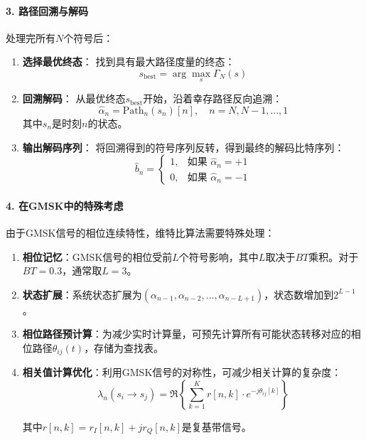 \documentclass[12pt,a4paper,twoside]{article}
\numberwithin{equation}{section}
\begin{document}
\paragraph{3. 路径回溯与解码}

处理完所有$N$个符号后：

\begin{enumerate}
    \item \textbf{选择最优终态}：
    找到具有最大路径度量的终态：
    \begin{equation}
        s_{\text{best}} = \arg\max_{s} \Gamma_N(s)
    \end{equation}
    
    \item \textbf{回溯解码}：
    从最优终态$s_{\text{best}}$开始，沿着幸存路径反向追溯：
    \begin{equation}
        \hat{\alpha}_n = \text{Path}_n(s_n)[n], \quad n = N, N-1, \dots, 1
    \end{equation}
    其中$s_n$是时刻$n$的状态。
    
    \item \textbf{输出解码序列}：
    将回溯得到的符号序列反转，得到最终的解码比特序列：
    \begin{equation}
        \hat{b}_n = 
        \begin{cases}
            1, & \text{如果 } \hat{\alpha}_n = +1 \\
            0, & \text{如果 } \hat{\alpha}_n = -1
        \end{cases}
    \end{equation}
\end{enumerate}


\paragraph{4. 在GMSK中的特殊考虑}

由于GMSK信号的相位连续特性，维特比算法需要特殊处理：

\begin{enumerate}
    \item \textbf{相位记忆}：GMSK信号的相位受前$L$个符号影响，其中$L$取决于$BT$乘积。对于$BT=0.3$，通常取$L=3$。
    
    \item \textbf{状态扩展}：系统状态扩展为$(\alpha_{n-1}, \alpha_{n-2}, \dots, \alpha_{n-L+1})$，状态数增加到$2^{L-1}$。
    
    \item \textbf{相位路径预计算}：为减少实时计算量，可预先计算所有可能状态转移对应的相位路径$\theta_{ij}(t)$，存储为查找表。
    
    \item \textbf{相关值计算优化}：利用GMSK信号的对称性，可减少相关计算的复杂度：
    \begin{equation}
        \lambda_n(s_i \rightarrow s_j) = \Re\left\{ \sum_{k=1}^{K} r[n,k] \cdot e^{-j\theta_{ij}[k]} \right\}
    \end{equation}

    其中$r[n,k] = r_I[n,k] + j r_Q[n,k]$是复基带信号。
\end{enumerate}
\end{document}
